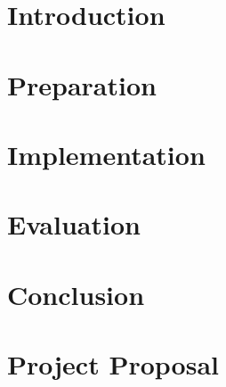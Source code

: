 \documentclass[12pt,a4paper,twoside,openany]{report}
\begin{document}
    \pagestyle{headings}


%    


    \chapter{Introduction}\label{ch:introduction}
    


    \chapter{Preparation}\label{ch:preparation}
    


    \chapter{Implementation}\label{ch:implementation}
    


    \chapter{Evaluation}\label{ch:evaluation}
    


    \chapter{Conclusion}\label{ch:conclusion}
    

%    


    \printbibliography[heading=bibintoc]

    \appendix

    \chapter{Project Proposal}\label{ch:proposal}
    
\end{document}
